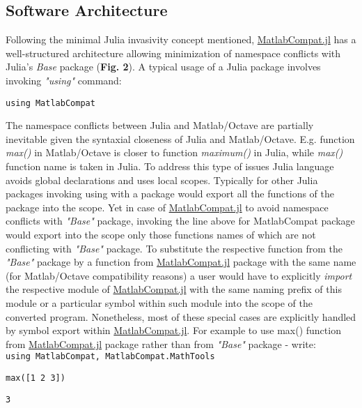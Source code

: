 \subsection{Software Architecture}
\label{Architecture} 

Following the minimal Julia invasivity concept mentioned, \href{https://github.com/MatlabCompat/MatlabCompat.jl}{MatlabCompat.jl} has a well-structured architecture allowing minimization of namespace conflicts with Julia's \textit{Base} package (\textbf{Fig. 2}). A typical usage of a Julia package involves invoking \textit{"using"} command:

\verb|using MatlabCompat|

The namespace conflicts between Julia and Matlab/Octave are partially inevitable given the syntaxial closeness of Julia and Matlab/Octave. E.g. function \textit{max()} in Matlab/Octave is closer to function \textit{maximum()} in Julia, while \textit{max()} function name is taken in Julia. To address this type of issues Julia language avoids global declarations and uses local scopes. Typically for other Julia packages invoking using with a package would export all the functions of the package into the scope. Yet in case of \href{https://github.com/MatlabCompat/MatlabCompat.jl}{MatlabCompat.jl} to avoid namespace conflicts with \textit{"Base"} package, invoking the line above for MatlabCompat package would export into the scope only those functions names of which are not conflicting with \textit{"Base"} package. To substitute the respective function from the \textit{"Base"} package by a function from \href{https://github.com/MatlabCompat/MatlabCompat.jl}{MatlabCompat.jl} package with the same name (for Matlab/Octave compatibility reasons) a user would have to explicitly \textit{import} the respective module of \href{https://github.com/MatlabCompat/MatlabCompat.jl}{MatlabCompat.jl} with the same naming prefix of this module or a particular symbol within such module into the scope of the converted program. Nonetheless, most of these special cases are explicitly handled by symbol export within \href{https://github.com/MatlabCompat/MatlabCompat.jl}{MatlabCompat.jl}. For example to use max() function from \href{https://github.com/MatlabCompat/MatlabCompat.jl}{MatlabCompat.jl} package rather than from \textit{"Base"} package - write:\\

\verb|using MatlabCompat, MatlabCompat.MathTools|

\verb|max([1 2 3])|

\verb|3|\\



